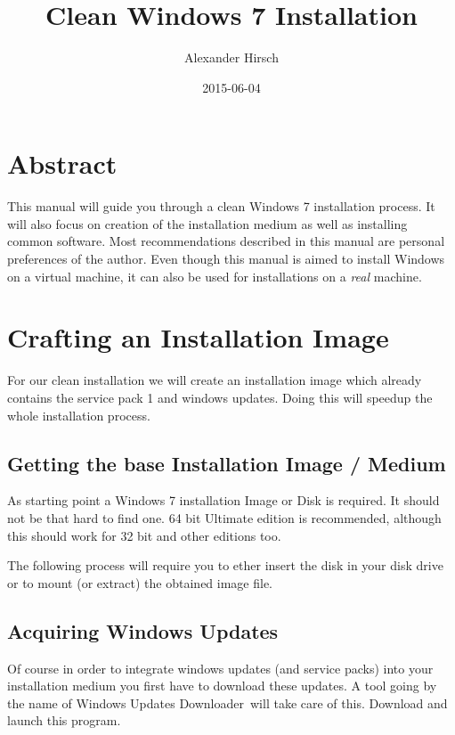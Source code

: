 \documentclass{itsarticle}
\title{Clean Windows 7 Installation}
\author{Alexander Hirsch}
\date{2015-06-04}
\begin{document}
\maketitle

\section*{Abstract}
\label{sec:abstract}

This manual will guide you through a clean Windows 7 installation process. It
will also focus on creation of the installation medium as well as installing
common software. Most recommendations described in this manual are personal
preferences of the author. Even though this manual is aimed to install Windows
on a virtual machine, it can also be used for installations on a \emph{real}
machine.

\section{Crafting an Installation Image}
\label{sec:install_image}

For our clean installation we will create an installation image which already
contains the service pack 1 and windows updates. Doing this will speedup the
whole installation process.

\subsection{Getting the base Installation Image / Medium}
\label{ssec:win7_base_iso}

As starting point a Windows 7 installation Image or Disk is required. It
should not be that hard to find one. 64 bit Ultimate edition is recommended,
although this should work for 32 bit and other editions too.

The following process will require you to ether insert the disk in your disk
drive or to mount (or extract) the obtained image file.

\subsection{Acquiring Windows Updates}
\label{ssec:get_win7_updates}

Of course in order to integrate windows updates (and service packs) into your
installation medium you first have to download these updates. A tool going by
the name of Windows Updates Downloader\footnotemark\ will take care of this.
Download and launch this program.
\end{document}
